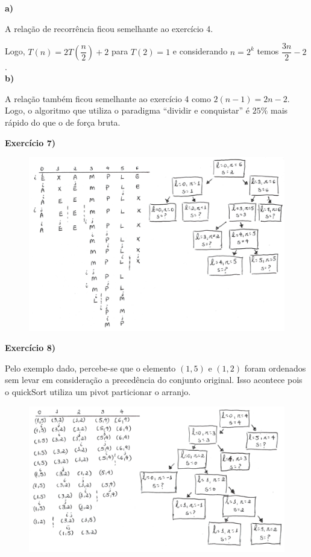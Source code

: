 \documentclass[12pt,a4paper]{article}
\begin{document}
\textbf{a)} 

A relação de recorrência ficou semelhante ao exercício 4.

Logo, $T(n) = 2T\left(\dfrac{n}{2}\right) + 2$ para $T(2)=1$ e considerando $n =2^k$ temos $\dfrac{3n}{2} - 2$.\\

\textbf{b)} 

A relação também ficou semelhante ao exercício 4 como $2(n-1) = 2n-2$. Logo, o algoritmo que utiliza o paradigma ``dividir e conquistar'' é $25\%$ mais rápido do que o de força bruta.



\hrulefill

\textbf{Exercício 7)} 

\begin{figure}[H]
    \centering
    \includegraphics[width=\textwidth]{images/exe7.pdf}
\end{figure}

\hrulefill

\textbf{Exercício 8)} 

Pelo exemplo dado, percebe-se que o elemento $(1,5)$ e  $(1,2)$ foram ordenados sem levar em consideração a precedência do conjunto original. Isso acontece pois o quickSort utiliza um pivot particionar o arranjo.

\begin{figure}[H]
    \centering
    \includegraphics[width=\textwidth]{images/exe8.pdf}
\end{figure}
\end{document}
